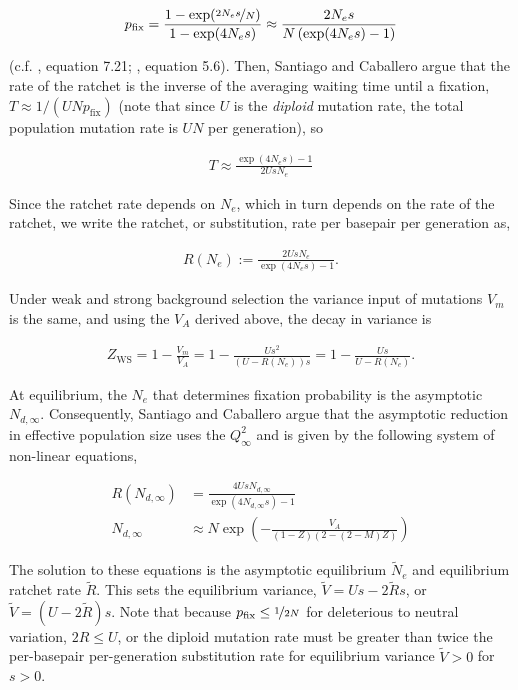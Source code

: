 \documentclass[11pt]{article}
\begin{document}
\begin{align}
  p_\text{fix} = \frac{1-\exp(\nicefrac{2 N_e s}{N})}{1-\exp(4 N_e s)} \approx
  \frac{2 N_e s}{N \left(\exp(4 N_e s)-1\right)}
\end{align}

(c.f. \cite{Durrett2008-ql}, equation 7.21; \cite{Kimura1957-rk}, equation
5.6). Then, Santiago and Caballero argue that the rate of the ratchet is the
inverse of the averaging waiting time until a fixation, $T \approx 1/(UN
p_\text{fix})$ (note that since $U$ is the \emph{diploid} mutation rate, the
total population mutation rate is $UN$ per generation), so

\begin{align}
  T \approx \frac{\exp(4 N_e s)-1}{2 U s N_e}
\end{align}

Since the ratchet rate depends on $N_e$, which in turn depends on the rate of
the ratchet, we write the ratchet, or substitution, rate per basepair per
generation as,

\begin{align}
  R(N_e) := \frac{2 U s N_e}{\exp(4 N_e s)-1}.
\end{align}

Under weak and strong background selection the variance input of mutations
$V_m$ is the same, and using the $V_A$ derived above, the decay in variance is

\begin{align}
  Z_\text{WS} = 1 - \frac{V_m}{V_A} = 1 - \frac{Us^2}{(U-R(N_e))s} = 1 - \frac{Us}{U-R(N_e)}.
\end{align}

At equilibrium, the $N_e$ that determines fixation probability is the
asymptotic $N_{d,\infty}$. Consequently, Santiago and Caballero argue that the
asymptotic reduction in effective population size uses the $Q_\infty^2$ and is
given by the following system of non-linear equations,

\begin{align}
  R(N_{d,\infty}) &= \frac{4 U s N_{d,\infty}}{\exp(4 N_{d,\infty} s)-1}\\
  N_{d,\infty} &\approx N \exp\left(-\frac{V_A}{(1-Z) (2-(2-M) Z)} \right)
\end{align}

The solution to these equations is the asymptotic equilibrium $\widetilde{N}_e$
and equilibrium ratchet rate $\widetilde{R}$. This sets the equilibrium
variance, $\widetilde{V} = Us - 2\widetilde{R}s$, or $\widetilde{V} = (U -
2\widetilde{R})s$. Note that because $p_\text{fix} \le \nicefrac{1}{2N}$ for
deleterious to neutral variation, $2R \le U$, or the diploid mutation rate must
be greater than twice the per-basepair per-generation substitution rate for
equilibrium variance $\widetilde{V} > 0$ for $s>0$. 
\end{document}
